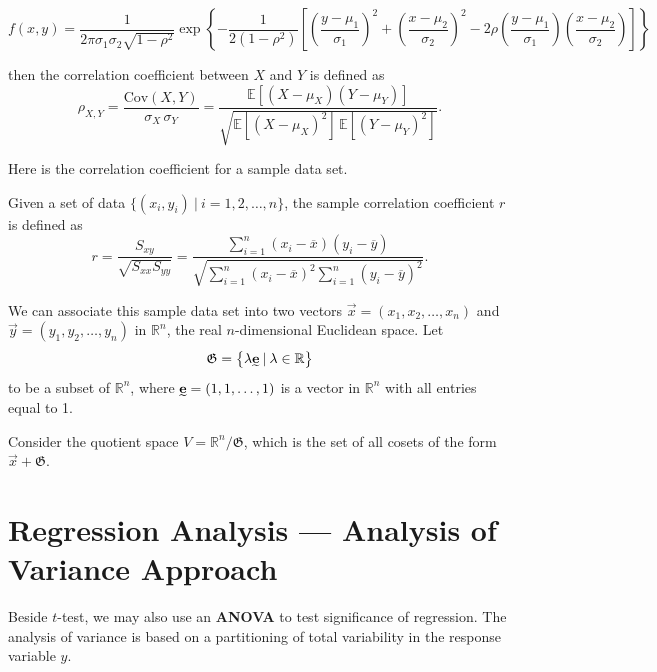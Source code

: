 \[
    f(x,y) = \frac{1}{2\pi \sigma_1 \sigma_2 \sqrt{1 - \rho^2}} \exp \left\{ -\frac{1}{2(1 - \rho^2)} 
    \left[ \left(\frac{y - \mu_1}{\sigma_1}\right)^2 + \left(\frac{x - \mu_2}{\sigma_2}\right)^2 -2\rho \left(\frac{y - \mu_1}{\sigma_1}\right)\left(\frac{x - \mu_2}{\sigma_2}\right) \right]\right\}
\]

then the correlation coefficient between $X$ and $Y$ is defined as
\begin{equation}
    \rho_{X,Y} = \frac{\text{Cov}(X,Y)}{\sigma_X \, \sigma_Y} = \frac{\mathbb{E}[(X - \mu_X)(Y - \mu_Y)]}{\sqrt{\mathbb{E}[(X - \mu_X)^2] \, \mathbb{E}[(Y - \mu_Y)^2]}}.
\end{equation}

Here is the correlation coefficient for a sample data set.

\begin{definition}
    Given a set of data $\{(x_i, y_i) \> | \> i = 1, 2, \ldots, n \}$, the sample correlation coefficient $r$ is defined as
    \begin{equation}
        r = \frac{S_{xy}}{\sqrt{S_{xx} S_{yy}}} = \frac{\sum_{i=1}^{n} (x_i - \overline{x})(y_i - \overline{y})}{\sqrt{\sum_{i=1}^{n} (x_i - \overline{x})^2 \sum_{i=1}^{n} (y_i - \overline{y})^2}}.
    \end{equation}
\end{definition}

We can associate this sample data set into two vectors 
$\overrightarrow{x} = ( x_1, x_2, \ldots, x_n )$ and $\overrightarrow{y} = (y_1, y_2, \ldots, y_n )$ in 
$\mathbb{R}^n$, the real $n$-dimensional Euclidean space. Let 
\[
    \mathfrak{G} = \left \{ \lambda \undertilde{\mathbf{e}} \> | \> \lambda \in \mathbb{R} \right \}
\]
to be a subset of $\mathbb{R}^n$, where $\undertilde{\mathbf{e}} = ( 1, 1, \ldots, 1 )$ is a vector in $\mathbb{R}^n$ with all 
entries equal to 1.

Consider the quotient space $V = \mathbb{R}^n / \mathfrak{G}$, which is the set of all cosets of the form $\overrightarrow{x} + \mathfrak{G}$.

\section{Regression Analysis --- Analysis of Variance Approach}

Beside $t$-test, we may also use an \textbf{ANOVA} to test significance of regression. The analysis of variance is based on a partitioning 
of total variability in the response variable $y$. 

